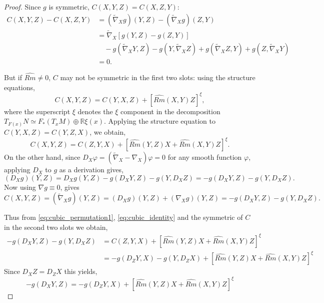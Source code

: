 \documentclass{amsart}
\theoremstyle{definition}
\theoremstyle{remark}
\numberwithin{equation}{section}
\begin{document}
\begin{proof}
Since $g$ is symmetric, $C(X, Y, Z) = C(X, Z, Y)$:
\[
\begin{split}
C(X, Y, Z) - C(X, Z, Y) &= (\tilde{\nabla}_X g) (Y, Z) - (\tilde{\nabla}_X g) (Z, Y) \\
&= \tilde{\nabla}_X \left[g(Y, Z) - g(Z, Y)\right] \\
&\quad - g(\tilde{\nabla}_X Y, Z) - g(Y, \tilde{\nabla}_X Z) + g(\tilde{\nabla}_X Z, Y) + g(Z, \tilde{\nabla}_X Y) \\
&= 0.
\end{split}
\]

But if $\widehat{Rm} \ne 0$, $C$ may not be symmetric in the first two slots: using the structure equations,
\[
C(X, Y, Z) = C(Y, X, Z) + [\widehat{Rm}(X, Y)Z]^{\xi},
\]
where the superscript $\xi$ denotes the $\xi$ component in the decomposition $T_{F(x)}N \simeq F_{\ast}(T_xM) \oplus \mathbb{R} \xi(x)$. Applying the structure equation to $C(Y, X, Z) = C(Y, Z, X)$, we obtain,
\begin{equation}
\label{eq:cubic_permutation1}
C(X, Y, Z) = C(Z, Y, X) + \left[\widehat{Rm}(Y, Z) X + \widehat{Rm}(X, Y) Z\right]^{\xi}.
\end{equation}
On the other hand, since $D_X \varphi = (\tilde{\nabla}_X - \nabla_X) \varphi = 0$ for any smooth function $\varphi$, applying $D_X$ to $g$ as a derivation gives,
\[
(D_X g) (Y, Z) = D_X g(Y, Z) -g(D_X Y, Z) - g(Y, D_X Z) = -g(D_X Y, Z) - g(Y, D_X Z).
\]
Now using $\nabla g \equiv 0$, gives
\begin{equation}
\label{eq:cubic_identity}
C(X, Y, Z) = (\tilde{\nabla}_X g) (Y, Z) = (D_X g) (Y, Z) + (\nabla_X g) (Y, Z) = -g(D_X Y, Z) - g(Y, D_X Z).
\end{equation}

Thus from \eqref{eq:cubic_permutation1}, \eqref{eq:cubic_identity} and the symmetric of $C$ in the second two slots we obtain,
\begin{align*}
-g(D_X Y, Z) - g(Y, D_X Z) &= C(Z, Y, X) + \left[\widehat{Rm}(Y, Z) X + \widehat{Rm}(X, Y)Z\right]^\xi \\
&= -g(D_Z Y, X) - g(Y, D_Z X) + \left[\widehat{Rm}(Y, Z) X + \widehat{Rm}(X, Y)Z\right]^\xi
\end{align*}
Since $D_X Z = D_Z X$ this yields,
\[
-g(D_X Y, Z) = - g(D_Z Y, X) + \left[\widehat{Rm}(Y, Z) X + \widehat{Rm}(X, Y)Z\right]^\xi
\]


\end{proof}
\end{document}
